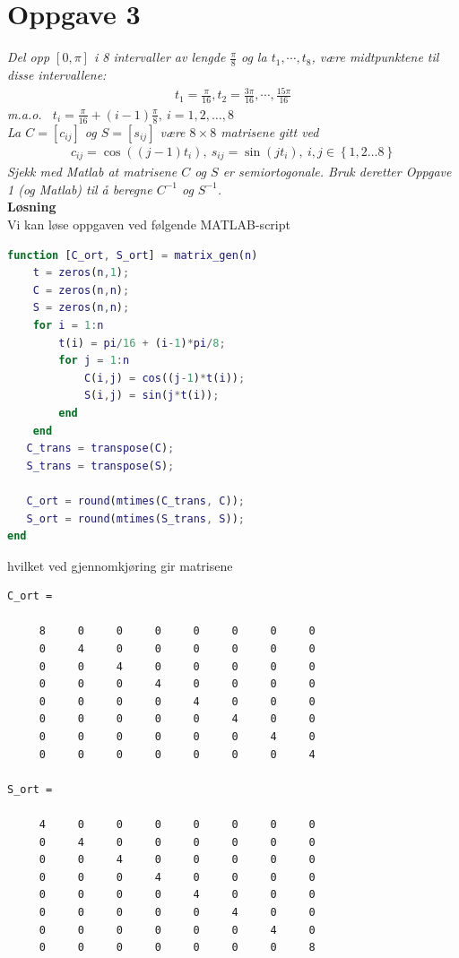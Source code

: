 \documentclass[12pt,
               a4paper,
               article,
               oneside,
               oldfontcommands,
               norsk]{memoir}
\begin{document}
\section*{Oppgave 3}
\emph{Del opp $[0, \pi]$ i 8 intervaller av lengde $\frac{\pi}{8}$ og la $t_1, \cdots , t_8$, være midtpunktene til disse intervallene:}
\begin{align*}
t_1 = \frac{\pi}{16}, t_2 = \frac{3\pi}{16}, \cdots , \frac{15\pi}{16}
\end{align*}
\emph{m.a.o. \ $t_i = \frac{\pi}{16} + (i-1)\frac{\pi}{8}, \ i= 1,2, \ldots, 8$}\vspace{2mm}\\
\emph{La $C = \left[c_{ij} \right]$ og $S = \left[s_{ij} \right]$  være $8 \times 8$ matrisene gitt ved}
\begin{align*}
c_{ij} = \cos((j-1)t_i), \ s_{ij} = \sin(jt_i), \ i,j \in \left\{1,2 \ldots 8 \right\}
\end{align*}
\emph{Sjekk med Matlab at matrisene $C$ og $S$ er semiortogonale. Bruk deretter Oppgave 1 (og Matlab) til å beregne $C^{-1}$ og $S^{-1}$.} \vspace{3mm}\\
\textbf{Løsning}\vspace{3mm}\\
Vi kan løse oppgaven ved følgende MATLAB-script
\begin{lstlisting}[language=MATLAB]
function [C_ort, S_ort] = matrix_gen(n)
    t = zeros(n,1);
    C = zeros(n,n);
    S = zeros(n,n);
    for i = 1:n
        t(i) = pi/16 + (i-1)*pi/8;
        for j = 1:n
            C(i,j) = cos((j-1)*t(i));
            S(i,j) = sin(j*t(i));
        end
    end
   C_trans = transpose(C);
   S_trans = transpose(S);
   
   C_ort = round(mtimes(C_trans, C));
   S_ort = round(mtimes(S_trans, S));
end
\end{lstlisting}
hvilket ved gjennomkjøring gir matrisene
\begin{verbatim}
C_ort =

     8     0     0     0     0     0     0     0
     0     4     0     0     0     0     0     0
     0     0     4     0     0     0     0     0
     0     0     0     4     0     0     0     0
     0     0     0     0     4     0     0     0
     0     0     0     0     0     4     0     0
     0     0     0     0     0     0     4     0
     0     0     0     0     0     0     0     4

S_ort =

     4     0     0     0     0     0     0     0
     0     4     0     0     0     0     0     0
     0     0     4     0     0     0     0     0
     0     0     0     4     0     0     0     0
     0     0     0     0     4     0     0     0
     0     0     0     0     0     4     0     0
     0     0     0     0     0     0     4     0
     0     0     0     0     0     0     0     8
\end{verbatim}
\end{document}
